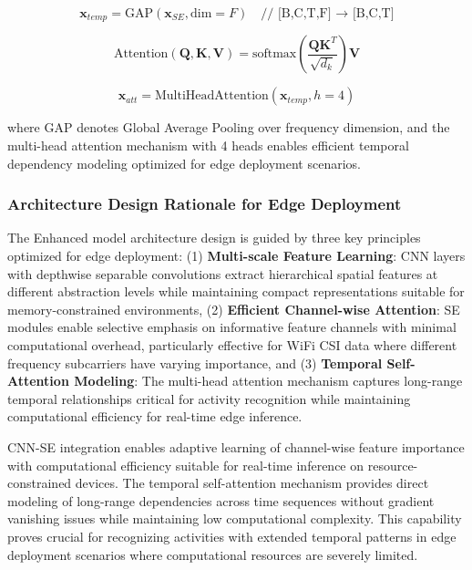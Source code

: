 \documentclass[journal]{IEEEtran}
\begin{document}
\begin{equation}
\mathbf{x}_{temp} = \text{GAP}(\mathbf{x}_{SE}, \text{dim}=F) \quad \text{// [B,C,T,F] → [B,C,T]}
\end{equation}

\begin{equation}
\text{Attention}(\mathbf{Q}, \mathbf{K}, \mathbf{V}) = \text{softmax}\left(\frac{\mathbf{Q}\mathbf{K}^T}{\sqrt{d_k}}\right)\mathbf{V}
\end{equation}

\begin{equation}
\mathbf{x}_{att} = \text{MultiHeadAttention}(\mathbf{x}_{temp}, h=4)
\end{equation}

where GAP denotes Global Average Pooling over frequency dimension, and the multi-head attention mechanism with 4 heads enables efficient temporal dependency modeling optimized for edge deployment scenarios.

\subsubsection{Architecture Design Rationale for Edge Deployment}

The Enhanced model architecture design is guided by three key principles optimized for edge deployment: (1) \textbf{Multi-scale Feature Learning}: CNN layers with depthwise separable convolutions extract hierarchical spatial features at different abstraction levels while maintaining compact representations suitable for memory-constrained environments, (2) \textbf{Efficient Channel-wise Attention}: SE modules enable selective emphasis on informative feature channels with minimal computational overhead, particularly effective for WiFi CSI data where different frequency subcarriers have varying importance, and (3) \textbf{Temporal Self-Attention Modeling}: The multi-head attention mechanism captures long-range temporal relationships critical for activity recognition while maintaining computational efficiency for real-time edge inference.

CNN-SE integration enables adaptive learning of channel-wise feature importance with computational efficiency suitable for real-time inference on resource-constrained devices. The temporal self-attention mechanism provides direct modeling of long-range dependencies across time sequences without gradient vanishing issues while maintaining low computational complexity. This capability proves crucial for recognizing activities with extended temporal patterns in edge deployment scenarios where computational resources are severely limited.
\end{document}
